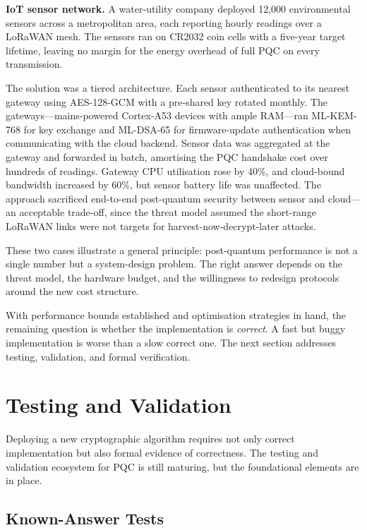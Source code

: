 \textbf{IoT sensor network.}\quad{}
A water-utility company deployed 12{,}000 environmental sensors across a metropolitan area, each reporting hourly readings over a LoRaWAN mesh.  The sensors ran on CR2032 coin cells with a five-year target lifetime, leaving no margin for the energy overhead of full PQC on every transmission.

The solution was a tiered architecture.  Each sensor authenticated to its nearest gateway using AES-128-GCM with a pre-shared key rotated monthly.  The gateways---mains-powered Cortex-A53 devices with ample RAM---ran ML-KEM-768 for key exchange and ML-DSA-65 for firmware-update authentication when communicating with the cloud backend.  Sensor data was aggregated at the gateway and forwarded in batch, amortising the PQC handshake cost over hundreds of readings.  Gateway CPU utilisation rose by 40\%, and cloud-bound bandwidth increased by 60\%, but sensor battery life was unaffected.  The approach sacrificed end-to-end post-quantum security between sensor and cloud---an acceptable trade-off, since the threat model assumed the short-range LoRaWAN links were not targets for harvest-now-decrypt-later attacks.

These two cases illustrate a general principle: post-quantum performance is not a single number but a system-design problem.  The right answer depends on the threat model, the hardware budget, and the willingness to redesign protocols around the new cost structure.

With performance bounds established and optimisation strategies in hand, the remaining question is whether the implementation is \emph{correct}.  A fast but buggy implementation is worse than a slow correct one.  The next section addresses testing, validation, and formal verification.


\section{Testing and Validation}
\label{sec:validation}

Deploying a new cryptographic algorithm requires not only correct implementation but also formal evidence of correctness.  The testing and validation ecosystem for PQC is still maturing, but the foundational elements are in place.

\subsection{Known-Answer Tests}
\label{subsec:kats}

